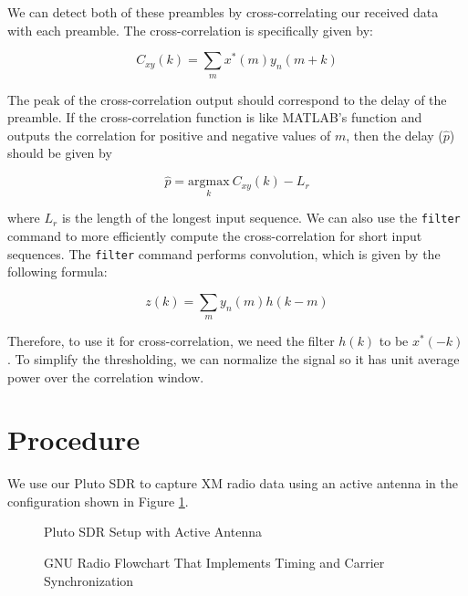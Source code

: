 \documentclass[conference,onecolumn]{IEEEtran}
\begin{document}
\noindent We can detect both of these preambles by cross-correlating our received data with each preamble. The cross-correlation is specifically given by:

\begin{equation}
	C_{xy}(k) = \sum_m{x^*(m)y_n(m+k)}
\end{equation}

\noindent The peak of the cross-correlation output should correspond to the delay of the preamble. If the cross-correlation function is like MATLAB's  function and outputs the correlation for positive and negative values of $m$, then the delay ($\hat{p}$) should be given by

\begin{equation}
	\hat{p} =  \underset{k}{\text{argmax}}\ C_{xy}(k) - L_r
\end{equation}

\noindent where $L_r$ is the length of the longest input sequence. We can also use the \texttt{filter} command to more efficiently compute the cross-correlation for short input sequences. The \texttt{filter} command performs convolution, which is given by the following formula:

\begin{equation}
	z(k) = \sum_{m}{y_n(m)h(k - m)}
\end{equation}

\noindent Therefore, to use it for cross-correlation, we need the filter $h(k)$ to be $x^*(-k)$. To simplify the thresholding, we can normalize the signal so it has unit average power over the correlation window.

\section{Procedure}

We use our Pluto SDR to capture XM radio data using an active antenna in the configuration shown in Figure \ref{fig::active_antenna_setup}.

\begin{figure}[H]	\centerline{}
	\caption{Pluto SDR Setup with Active Antenna}
	\label{fig::active_antenna_setup}
\end{figure}

\begin{figure}[H]
	\centerline{}
	\caption{GNU Radio Flowchart That Implements Timing and Carrier Synchronization}
	\label{fig::timing_carrier_sync}
\end{figure}
\end{document}
